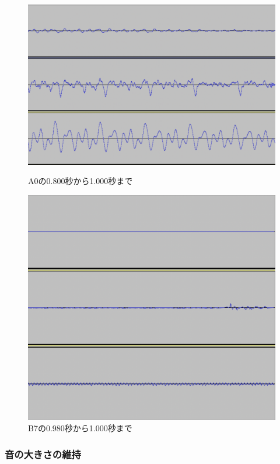 \begin{figure}[b]
\centering
\begin{minipage}[b]{0.48\columnwidth}
\centering
\includegraphics[width=0.85\columnwidth]{figure/88_88_det/a0_0800_1000.png}
\caption[A0の音波]{A0の0.800秒から1.000秒まで}
\label{fig:88_88_reduce1}
\end{minipage}
\begin{minipage}[b]{0.48\columnwidth}
\centering
\includegraphics[width=0.75\columnwidth]{figure/88_88_det/b7_0980_1000.png}
\caption[B7の音波]{B7の0.980秒から1.000秒まで}
\label{fig:88_88_reduce2}
\end{minipage}
\end{figure}

\clearpage

\subsubsection{音の大きさの維持}


